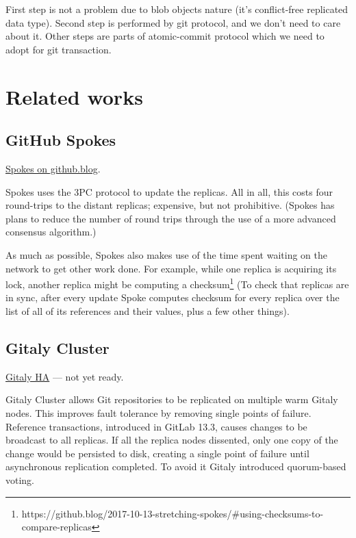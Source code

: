 \documentclass[sigplan, screen, nonacm, 11pt]{acmart}
\begin{document}
First step is not a problem due to blob objects nature (it's conflict-free replicated data type).
Second step is performed by git protocol, and we don't need to care about it.
Other steps are parts of atomic-commit protocol which we need to adopt for git transaction.

\section{Related works}

\subsection{GitHub Spokes}

\href{https://github.blog/2017-10-13-stretching-spokes/}{Spokes on github.blog}.

Spokes uses the 3PC protocol to update the replicas.
All in all, this costs four round-trips to the distant replicas;
expensive, but not prohibitive.
(Spokes has plans to reduce the number of round trips through the use of a more advanced consensus algorithm.)

As much as possible, Spokes also makes use of the time spent waiting on the network to get other work done.
For example, while one replica is acquiring its lock,
another replica might be computing a checksum\footnote{https://github.blog/2017-10-13-stretching-spokes/\#using-checksums-to-compare-replicas} (To check that replicas are in sync, after every update Spoke computes checksum for every replica over the list of all of its references and their values, plus a few other things).





\subsection{Gitaly Cluster}

\href{https://gitlab.com/groups/gitlab-org/-/epics/1189}{Gitaly HA} --- not yet ready.

Gitaly Cluster allows Git repositories to be replicated on multiple warm Gitaly nodes.
This improves fault tolerance by removing single points of failure.
Reference transactions, introduced in GitLab 13.3,
causes changes to be broadcast to all replicas.
If all the replica nodes dissented, only one copy of the change would be persisted to disk,
creating a single point of failure until asynchronous replication completed.
To avoid it Gitaly introduced quorum-based voting.
\end{document}
